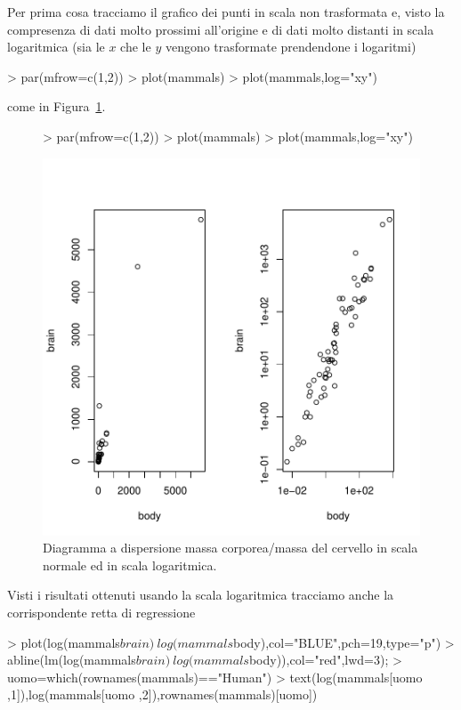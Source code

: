 \documentclass[onecolumn,12pt]{book}
\begin{document}
Per prima cosa tracciamo il grafico dei punti  in scala non trasformata e, visto la compresenza di dati molto prossimi all'origine e di dati molto distanti in scala logaritmica (sia le $x$ che le $y$ vengono trasformate prendendone i logaritmi)
\begin{Schunk}
\begin{Sinput}
> par(mfrow=c(1,2))
> plot(mammals)
> plot(mammals,log="xy")
\end{Sinput}
\end{Schunk}
come in Figura~\ref{fig:duemammals}.\begin{figure}[htbp]
\begin{center}
\begin{Schunk}
\begin{Sinput}
> par(mfrow=c(1,2))
> plot(mammals)
> plot(mammals,log="xy")
\end{Sinput}
\end{Schunk}
\includegraphics{RbookParte2-052}
\caption{Diagramma a dispersione massa corporea/massa del cervello in scala normale ed in scala logaritmica. }
\label{fig:duemammals}
\end{center}
\end{figure}
Visti i  risultati ottenuti usando la scala logaritmica tracciamo anche la corrispondente retta di regressione
\begin{Schunk}
\begin{Sinput}
> plot(log(mammals$brain)~log(mammals$body),col="BLUE",pch=19,type="p")
> abline(lm(log(mammals$brain)~ log(mammals$body)),col="red",lwd=3);
> uomo=which(rownames(mammals)=="Human")
> text(log(mammals[uomo ,1]),log(mammals[uomo ,2]),rownames(mammals)[uomo])
\end{Sinput}
\end{Schunk}
\end{document}
